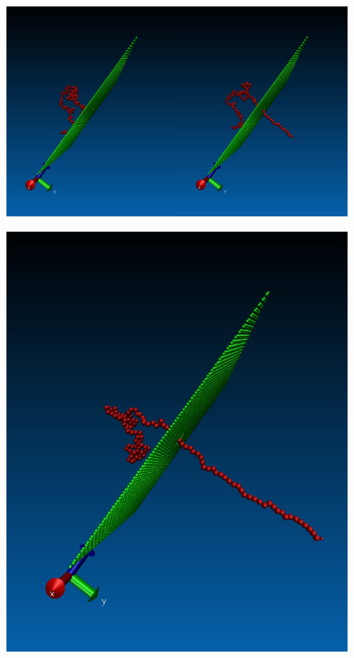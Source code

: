 \begin{figure}[H]
\includegraphics[width=0.5\textwidth]{simplepoltransloc1.jpg}\includegraphics[width=0.5\textwidth]{simplepoltransloc2.jpg}
\begin{minipage}{0.5\linewidth}
\includegraphics[width=\textwidth]{simplepoltransloc3.jpg}

\end{minipage}
\end{figure}
